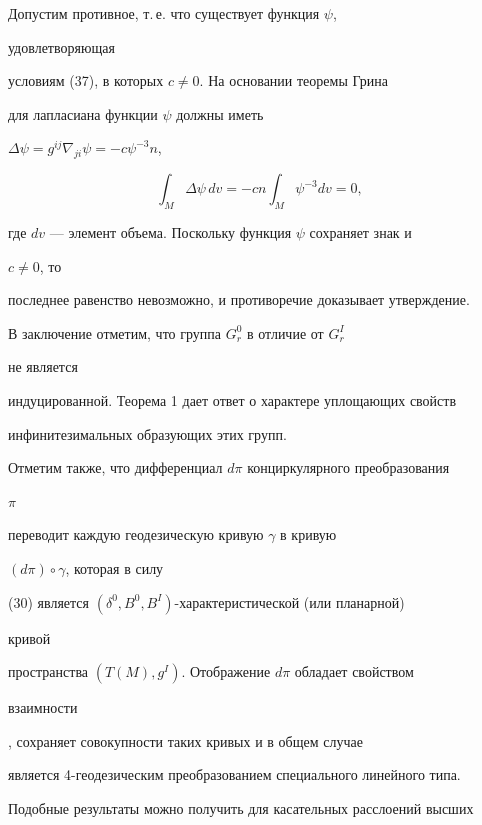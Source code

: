 \begin{pf}


Допустим противное, т.\,е. что существует функция $\psi$,


удовлетворяющая


условиям (37), в которых $c\ne 0$. На основании теоремы Грина \cite{16}


для лапласиана функции $\psi$ должны иметь


$\Delta\psi=g^{ij}\nabla_{ji}\psi=-c\psi^{-3}n$,


$$


\int_M\Delta\psi\,dv=-cn\int_M\psi^{-3}dv=0,


$$


где $dv$ --- элемент объема. Поскольку функция $\psi$ сохраняет знак и


$c\ne 0$, то


последнее равенство невозможно, и противоречие доказывает утверждение.


\end{pf}





В заключение отметим, что группа $G^0_r$ в отличие от $G^I_r$


не является


индуцированной. Теорема 1 дает ответ о характере уплощающих свойств


инфинитезимальных образующих этих групп.





Отметим также, что дифференциал $d\pi$ конциркулярного преобразования


$\pi$


переводит каждую геодезическую кривую $\gamma$ в кривую


$(d\pi)\circ\gamma$, которая в силу


(30) является $(\delta^0,B^0,B^I)$-характеристической (или планарной)


кривой \cite{17}


пространства $(T(M),g^I)$. Отображение $d\pi$ обладает свойством


взаимности


\cite{18}, сохраняет совокупности таких кривых и в общем случае


является 4-геодезическим преобразованием специального линейного типа.





Подобные результаты можно получить для касательных расслоений высших


